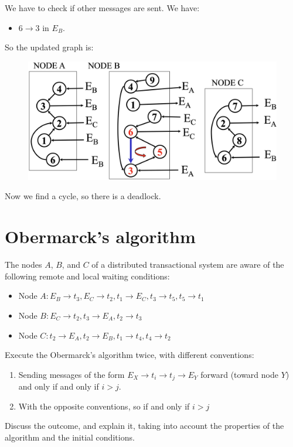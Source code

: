 \documentclass[12pt, a4paper]{report}
\newtheorem[style=M,bodystyle=\normalfont]{theorem}{Theorem}
\newtheorem[style=M,bodystyle=\normalfont]{corollary}{Corollary}
\newtheorem[style=M,bodystyle=\normalfont]{lemma}{Lemma}
\newtheorem[style=M,bodystyle=\normalfont]{definition}{Definition}
\begin{document}
        We have to check if other messages are sent. We have:
        \begin{itemize}
            \item $6 \rightarrow 3$ in $E_B$. 
        \end{itemize}
        So the updated graph is: 
        \begin{figure}[H]
            \centering
            \includegraphics[width=1\linewidth]{images/Ob3.png}
        \end{figure}
        Now we find a cycle, so there is a deadlock. 

    \newpage

    \section{Obermarck's algorithm}
        The nodes $A$, $B$, and $C$ of a distributed transactional system are aware of the following remote and local waiting conditions:
        \begin{itemize}
            \item Node $A: E_B \rightarrow t_3, E_C \rightarrow t_2, t_1 \rightarrow E_C, t_3 \rightarrow t_5, t_5 \rightarrow t_1$
            \item Node $B: E_C \rightarrow t_2, t_3 \rightarrow E_A, t_2 \rightarrow t_3$
            \item Node $C: t_2 \rightarrow E_A, t_2 \rightarrow E_B, t_1 \rightarrow t_4, t_4 \rightarrow t_2$
        \end{itemize}
        Execute the Obermarck's algorithm twice, with different conventions:
        \begin{enumerate}
            \item Sending messages of the form $E_X \rightarrow t_i \rightarrow t_j \rightarrow E_Y$ forward (toward node $Y$) and only 
                if and only if $i > j$. 
            \item With the opposite conventions, so if and only if $i > j$
        \end{enumerate}
        Discuss the outcome, and explain it, taking into account the properties of the algorithm and the initial conditions.
\end{document}
